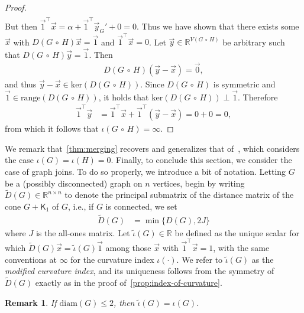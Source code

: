 \documentclass[11pt,a4paper]{article}
\newcommand{\distmatrix}{D}
\newcommand{\x}{\vec{x}}
\newcommand{\y}{\vec{y}}
\newcommand{\one}{\vec{1}}
\newcommand{\Complete}{\mathsf{K}}
\newtheorem{remark}[theorem]{Remark}
\newcommand{\Circ}{\circ}
\begin{document}
\begin{proof}
\begin{align*}
            \end{align*}
        But then $\one^\top \x = \alpha + \one^\top \y_G' + 0 = 0$. Thus we have shown that there exists some $\x$ with $\distmatrix(G\,\Circ\,H)\x = \one$ and $\one^\top\x = 0$. Let $\y\in\mathbb{R}^{V(G\,\Circ\,H)}$ be arbitrary such that $\distmatrix(G\,\Circ\,H)\y = \one$. Then
            \begin{align*}
                \distmatrix(G\,\Circ\,H)(\y - \x) = \vec{0},
            \end{align*}
        and thus $\y-\x \in \mathrm{ker}(\distmatrix(G\,\Circ\,H))$. Since $\distmatrix(G\,\Circ\,H)$ is symmetric and $\one\in\mathrm{range}(\distmatrix(G\,\Circ\,H))$, it holds that $\mathrm{ker}(\distmatrix(G\,\Circ\,H)) \perp \one$. Therefore
            \begin{align*}
                \one^\top \y &= \one^\top \x + \one^\top (\y - \x) = 0 + 0 = 0,
            \end{align*}
        from which it follows that $\iota(G\,\Circ\,H) = \infty$.
    \end{proof}

    We remark that~\cref{thm:merging} recovers and generalizes that of~\cite{chen2023steinerberger}, which considers the case $\iota(G) = \iota(H) = 0$. Finally, to conclude this section, we consider the case of graph joins. To do so properly, we introduce a bit of notation. Letting $G$ be a (possibly disconnected) graph on $n$ vertices, begin by writing $\widetilde{D}(G)\in\mathbb{R}^{n\times n}$ to denote the principal submatrix of the distance matrix of the cone $G+\Complete_1$ of $G$, i.e., if $G$ is connected, we set
            \begin{align*}
                \widetilde{D}(G) &= \min\{\distmatrix(G), 2J\}
            \end{align*}
    where $J$ is the all-ones matrix. Let $\widetilde{\iota}(G)\in\mathbb{R}$ be defined as the unique scalar for which $\widetilde{D}(G)\x = \widetilde{\iota}(G)\one$ among those $\x$ with $\one^\top \x = 1$, with the same conventions at $\infty$ for the curvature index $\iota(\cdot)$. We refer to $\widetilde{\iota}(G)$ as the \emph{modified curvature index}, and its uniqueness follows from the symmetry of $\widetilde{D}(G)$ exactly as in the proof of~\cref{prop:index-of-curvature}.

    \begin{remark}\label{rmk:diam2-modified-index}
        If $\mathrm{diam}(G)\le 2$, then $\widetilde{\iota}(G) = \iota(G)$.
    \end{remark}
\end{document}
